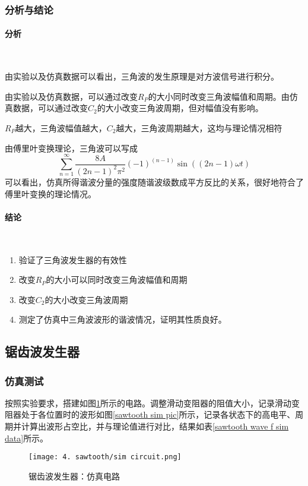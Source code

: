 \documentclass[UTF8]{ctexart}
\numberwithin{figure}{subsection}
\numberwithin{table}{subsection}
\numberwithin{equation}{subsection}
\begin{document}
\subsubsection{分析与结论}
\paragraph{分析}~{}
\par 由实验以及仿真数据可以看出，三角波的发生原理是对方波信号进行积分。
\par 由实验以及仿真数据，可以通过改变\(R_P\)的大小同时改变三角波幅值和周期。由仿真数据，可以通过改变\(C_2\)的大小改变三角波周期，但对幅值没有影响。
\par \(R_P\)越大，三角波幅值越大，\(C_2\)越大，三角波周期越大，这均与理论情况相符
\par 由傅里叶变换理论，三角波可以写成
\[\sum_{n = 1}^{\infty} \frac{8A}{\left(2n-1\right)^2\pi^2} \left(-1\right)^{(n-1)}\sin\left(\left(2n-1\right)\omega t\right)\]
可以看出，仿真所得谐波分量的强度随谐波级数成平方反比的关系，很好地符合了傅里叶变换的理论情况。

\paragraph{结论}~{}
\par 
\begin{enumerate}
    \item 验证了三角波发生器的有效性
    \item 改变\(R_P\)的大小可以同时改变三角波幅值和周期
    \item 改变\(C_2\)的大小改变三角波周期
    \item 测定了仿真中三角波波形的谐波情况，证明其性质良好。
\end{enumerate}

\subsection{锯齿波发生器}
\subsubsection{仿真测试}
\par 按照实验要求，搭建如图\ref{sawtooth sim circuit}所示的电路。调整滑动变阻器的阻值大小，记录滑动变阻器处于各位置时的波形如图\ref{sawtooth sim pic}所示，记录各状态下的高电平、周期并计算出波形占空比，并与理论值进行对比，结果如表\ref{sawtooth wave f sim data}所示。


\begin{figure}[H]
    \begin{center}
        \caption{锯齿波发生器：仿真电路}
        \texttt{[image: 4. sawtooth/sim circuit.png]}
        \label{sawtooth sim circuit}
    \end{center}
\end{figure}
\end{document}
